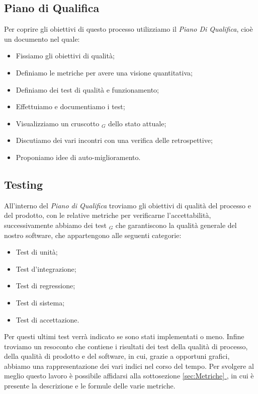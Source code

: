   \subsection{Piano di Qualifica}
  Per coprire gli obiettivi di questo processo utilizziamo il \textit{Piano Di Qualifica}, cioè un documento nel quale:
  \begin{itemize}
      \item Fissiamo gli obiettivi di qualità;
      \item Definiamo le metriche per avere una visione quantitativa;
      \item Definiamo dei test di qualità e funzionamento;
      \item Effettuiamo e documentiamo i test;
      \item Visualizziamo un cruscotto $_G$ dello stato attuale;
      \item Discutiamo dei vari incontri con una verifica delle retrospettive;
      \item Proponiamo idee di auto-miglioramento.
  \end{itemize}

  \subsection{Testing}
  All'interno del \textit{Piano di Qualifica} troviamo gli obiettivi di qualità del processo e del prodotto, con le relative metriche per verificarne l'accettabilità, successivamente abbiamo dei test $_G$ che garantiscono la qualità generale del nostro software, che appartengono alle seguenti categorie:
  \begin{itemize}
      \item Test di unità;
      \item Test d'integrazione;
      \item Test di regressione;
      \item Test di sistema;
      \item Test di accettazione.
  \end{itemize}
  Per questi ultimi test verrà indicato se sono stati implementati o meno.
  \newline
  Infine troviamo un resoconto che contiene i risultati dei test della qualità di processo, della qualità di prodotto e del software, in cui, grazie a opportuni grafici, abbiamo una rappresentazione dei vari indici nel corso del tempo. Per svolgere al meglio questo lavoro è possibile affidarsi alla sottosezione \underline{\ref{sec:Metriche} }, in cui è presente la descrizione e le formule delle varie metriche.


